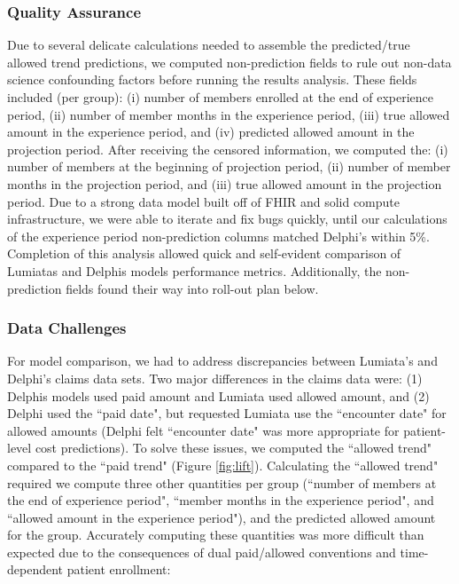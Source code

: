 \documentclass[letterpaper]{article} %
\begin{document}
\subsubsection{Quality Assurance}
Due to several delicate calculations needed to assemble the predicted/true allowed trend predictions, we computed non-prediction fields to rule out non-data science confounding factors before running the results analysis. These fields included (per group):
(i) number of members enrolled at the end of experience period,
(ii) number of member months in the experience period,
(iii) true allowed amount in the experience period, and
(iv) predicted allowed amount in the projection period.
After receiving the censored information, we computed the:
(i) number of members at the beginning of projection period,
(ii) number of member months in the projection period, and
(iii) true allowed amount in the projection period.
Due to a strong data model built off of FHIR and solid compute infrastructure, we were able to iterate and fix bugs quickly, until our calculations of the experience period non-prediction columns matched Delphi's within 5\%. Completion of this analysis allowed quick and self-evident comparison of Lumiatas and Delphis models performance metrics. Additionally, the non-prediction fields found their way into roll-out plan below.

\subsubsection{Data Challenges}
For model comparison, we had to address discrepancies between Lumiata's and Delphi's claims data sets.  Two major differences in the claims data were: 
(1) Delphis models used paid amount and Lumiata used allowed amount, and
(2) Delphi used the ``paid date", but requested Lumiata use the ``encounter date" for allowed amounts (Delphi felt ``encounter date" was more appropriate for patient-level cost predictions). 
To solve these issues, we computed the ``allowed trend" compared to the ``paid trend" (Figure \ref{fig:lift}).  Calculating the ``allowed trend" required we compute three other quantities per group (``number of members at the end of experience period", ``member months in the experience period", and ``allowed amount in the experience period"), and the predicted allowed amount for the group.  Accurately computing these quantities was more difficult than expected due to the consequences of dual paid/allowed conventions and time-dependent patient enrollment:
\end{document}
